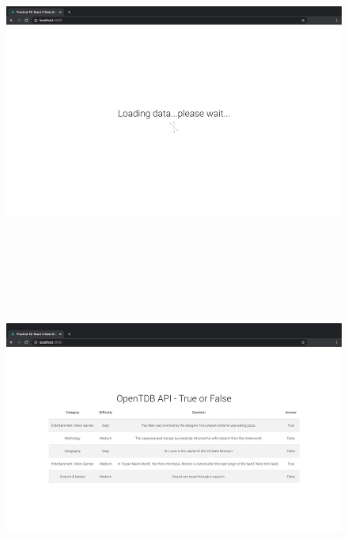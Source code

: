 \documentclass{article}
\begin{document}
\begin{figure}[H]
  \includegraphics[width=175mm, height=105mm]{./img/18-expected-opentdb-1.png}
  \includegraphics[width=175mm, height=105mm]{./img/18-expected-opentdb-2.png}
\end{figure}
\end{document}
